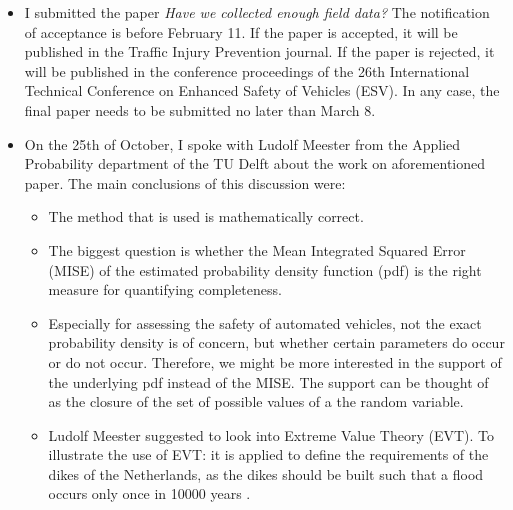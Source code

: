 \documentclass[10pt,final,a4paper,oneside,onecolumn]{article}
\begin{document}
\begin{itemize}
	\item I submitted the paper \emph{Have we collected enough field data?} The notification of acceptance is before February 11. If the paper is accepted, it will be published in the Traffic Injury Prevention journal. If the paper is rejected, it will be published in the conference proceedings of the 26th International Technical Conference on Enhanced Safety of Vehicles (ESV). In any case, the final paper needs to be submitted no later than March 8.
	
	\item On the 25th of October, I spoke with Ludolf Meester from the Applied Probability department of the TU Delft about the work on aforementioned paper. The main conclusions of this discussion were:
	\begin{itemize}
		\item The method that is used is mathematically correct. 
		\item The biggest question is whether the Mean Integrated Squared Error (MISE) of the estimated probability density function (pdf) is the right measure for quantifying completeness.
		\item Especially for assessing the safety of automated vehicles, not the exact probability density is of concern, but whether certain parameters do occur or do not occur. Therefore, we might be more interested in the support of the underlying pdf instead of the MISE. The support can be thought of as the closure of the set of possible values of a the random variable.
		\item Ludolf Meester suggested to look into Extreme Value Theory (EVT). To illustrate the use of EVT: it is applied to define the requirements of the dikes of the Netherlands, as the dikes should be built such that a flood occurs only once in 10000 years \cite{dehaan1994extreme}.
	\end{itemize}
	

\end{itemize}
\end{document}
